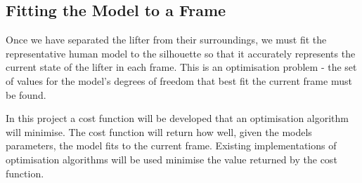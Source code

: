\subsection{Fitting the Model to a Frame}

Once we have separated the lifter from their surroundings, we must fit the representative human model to the silhouette so that it accurately represents the current state of the lifter in each frame. This is an optimisation problem - the set of values for the model's degrees of freedom that best fit the current frame must be found.

In this project a cost function will be developed that an optimisation algorithm will minimise. The cost function will return how well, given the models parameters, the model fits to the current frame. Existing implementations of optimisation algorithms will be used minimise the value returned by the cost function.